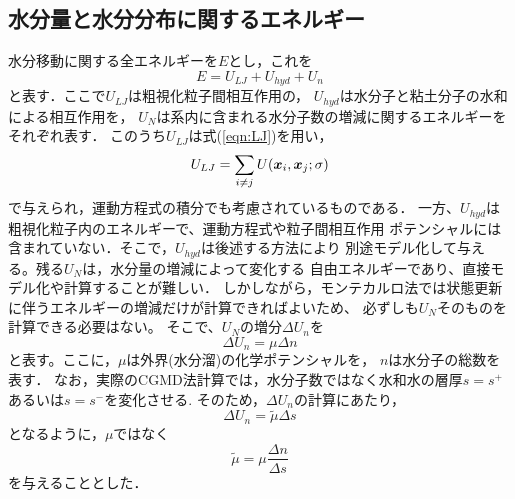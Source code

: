 \subsection{水分量と水分分布に関するエネルギー}
水分移動に関する全エネルギーを$E$とし，これを
\begin{equation}
	E=U_{LJ} +U_{hyd} + U_n
	\label{eqn:}
\end{equation}
と表す．ここで$U_{LJ}$は粗視化粒子間相互作用の， 
$U_{hyd}$は水分子と粘土分子の水和による相互作用を，
$U_N$は系内に含まれる水分子数の増減に関するエネルギーをそれぞれ表す．
このうち$U_{LJ}$は式(\ref{eqn:LJ})を用い，
\begin{equation}
	U_{LJ}=\sum_{i\neq j} U(\mbox{\boldmath $x$}_i,\mbox{\boldmath $x$}_j;\sigma)
	\label{eqn:}
\end{equation}
で与えられ，運動方程式の積分でも考慮されているものである．
一方、$U_{hyd}$は粗視化粒子内のエネルギーで、運動方程式や粒子間相互作用
ポテンシャルには含まれていない．そこで，$U_{hyd}$は後述する方法により
別途モデル化して与える。残る$U_N$は，水分量の増減によって変化する
自由エネルギーであり、直接モデル化や計算することが難しい．
しかしながら，モンテカルロ法では状態更新に伴うエネルギーの増減だけが計算できればよいため、
必ずしも$U_N$そのものを計算できる必要はない。
そこで、$U_N$の増分$\Delta U_n$を
\begin{equation}
	\Delta U_n =\mu \Delta n
	\label{eqn:}
\end{equation}
と表す。ここに，$\mu$は外界(水分溜)の化学ポテンシャルを，
$n$は水分子の総数を表す．
なお，実際のCGMD法計算では，水分子数ではなく水和水の層厚$s=s^{+}$あるいは$s=s^{-}$を変化させる. 
そのため，$\Delta U_n$の計算にあたり，
\begin{equation}
	\Delta U_n =\tilde \mu \Delta s
	\label{eqn:}
\end{equation}
となるように，$\mu$ではなく
\begin{equation}
	\tilde \mu =\mu \frac{\Delta n}{\Delta s}
	\label{eqn:}
\end{equation}
を与えることとした．
